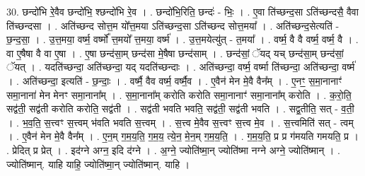 \documentclass[17pt]{extarticle}
\begin{document}
30. छन्दो॑भि रे॒वैव छन्दो॑भि॒ श्छन्दो॑भि रे॒व । . छन्दो॑भि॒रिति॒ छन्दः॑ - भिः॒ । . ए॒वा ति॑च्छन्द॒सा ऽति॑च्छन्दसै॒ वैवा ति॑च्छन्दसा । . अति॑च्छन्द सोत्त॒म यो᳚त्त॒मया ऽति॑च्छन्द॒सा ऽति॑च्छन्द सोत्त॒मया᳚ । . अति॑च्छन्द॒सेत्यति॑ - छ॒न्द॒सा॒ । . उ॒त्त॒मया॒ वर्ष्म॒ वर्ष्मो᳚ त्त॒मयो᳚ त्त॒मया॒ वर्ष्म॑ । . उ॒त्त॒मयेत्यु॑त् - त॒मया᳚ । . वर्ष्म॒ वै वै वर्ष्म॒ वर्ष्म॒ वै । . वा ए॒षैषा वै वा ए॒षा । . ए॒षा छन्द॑सा॒म् छन्द॑सा मे॒षैषा छन्द॑साम् । . छन्द॑सां॒ ॅयद् यच् छन्द॑सा॒म् छन्द॑सां॒ ॅयत् । . यदति॑च्छन्दा॒ अति॑च्छन्दा॒ यद् यदति॑च्छन्दाः । . अति॑च्छन्दा॒ वर्ष्म॒ वर्ष्मा ति॑च्छन्दा॒ अति॑च्छन्दा॒ वर्ष्म॑ । . अति॑च्छन्दा॒ इत्यति॑ - छ॒न्दाः॒ । . वर्ष्मै॒ वैव वर्ष्म॒ वर्ष्मै॒व । . ए॒वैन॑ मेन मे॒वै वैन᳚म् । . ए॒नꣳ॒॒ स॒मा॒नानाꣳ॑ समा॒नाना॑ मेन मेनꣳ समा॒नाना᳚म् । . स॒मा॒नाना᳚म् करोति करोति समा॒नानाꣳ॑ समा॒नाना᳚म् करोति । . क॒रो॒ति॒ सद्व॑ती॒ सद्व॑ती करोति करोति॒ सद्व॑ती । . सद्व॑ती भवति भवति॒ सद्व॑ती॒ सद्व॑ती भवति । . सद्व॒तीति॒ सत् - व॒ती॒ । . भ॒व॒ति॒ स॒त्त्वꣳ स॒त्त्वम् भ॑वति भवति स॒त्त्वम् । . स॒त्त्व मे॒वैव स॒त्त्वꣳ स॒त्त्व मे॒व । . स॒त्त्वमिति॑ सत् - त्वम् । . ए॒वैन॑ मेन मे॒वै वैन᳚म् । . ए॒न॒म् ग॒म॒य॒ति॒ ग॒म॒य॒ त्ये॒न॒ मे॒न॒म् ग॒म॒य॒ति॒ । . ग॒म॒य॒ति॒ प्र प्र ग॑मयति गमयति॒ प्र । . प्रेदित् प्र प्रेत् । . इद॑ग्ने अग्न॒ इदि द॑ग्ने । . अ॒ग्ने॒ ज्योति॑ष्मा॒न् ज्योति॑ष्मा नग्ने अग्ने॒ ज्योति॑ष्मान् । . ज्योति॑ष्मान्. याहि याहि॒ ज्योति॑ष्मा॒न् ज्योति॑ष्मान्. याहि । \newline
\end{document}
